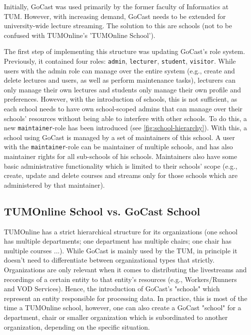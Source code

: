 Initially, GoCast was used primarily by the former faculty of Informatics at TUM. However, with increasing demand, GoCast needs to be extended for university-wide lecture streaming. The solution to this are schools (not to be confused with TUMOnline's 'TUMOnline School').

The first step of implementing this structure was updating GoCast's role system. Previously, it contained four roles: \texttt{admin}, \texttt{lecturer}, \texttt{student}, \texttt{visitor}. While users with the admin role can manage over the entire system (e.g., create and delete lectures and users, as well as perform maintenance tasks), lecturers can only manage their own lectures and students only manage their own profile and preferences. However, with the introduction of schools, this is not sufficient, as each school needs to have own school-scoped admins that can manage over their schools' resources without being able to interfere with other schools. To do this, a new \texttt{maintainer}-role has been introduced (see \autoref{fig:school-hierarchy}).
With this, a school using GoCast is managed by a set of maintainers of this school. A user with the \texttt{maintainer}-role can be maintainer of multiple schools, and has also maintainer rights for all sub-schools of his schools.  
Maintainers also have some basic administrative functionality which is limited to their schools' scope (e.g., create, update and delete courses and streams only for those schools which are administered by that maintainer). 

\subsection{TUMOnline School vs. GoCast School}

TUMOnline has a strict hierarchical structure for its organizations (one school has multiple departments; one department has multiple chairs; one chair has multiple courses ...).
%
While GoCast is mainly used by the TUM, in principle it doesn't need to differentiate between organizational types that strictly. Organizations are only relevant when it comes to distributing the livestreams and recordings of a certain entity to that entity's resources (e.g., Workers/Runners and VOD Services). Hence, the introduction of GoCast's "schools" which represent an entity responsible for processing data. In practice, this is most of the time a TUMOnline school, however, one can also create a GoCast "school" for a department, chair or smaller organization which is subordinated to another organization, depending on the specific situation.

